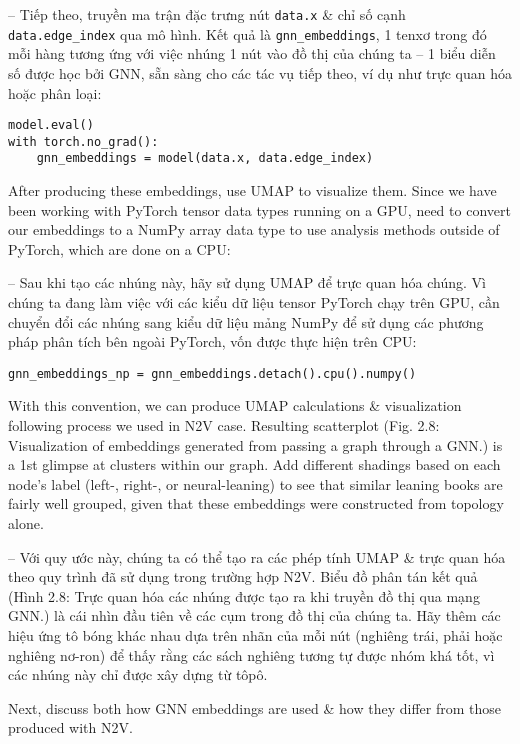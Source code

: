 \documentclass{article}
\begin{document}
\begin{itemize}
\begin{itemize}
\begin{itemize}
\begin{itemize}
               -- Tiếp theo, truyền ma trận đặc trưng nút {\tt data.x} \& chỉ số cạnh \verb|data.edge_index| qua mô hình. Kết quả là \verb|gnn_embeddings|, 1 tenxơ trong đó mỗi hàng tương ứng với việc nhúng 1 nút vào đồ thị của chúng ta -- 1 biểu diễn số được học bởi GNN, sẵn sàng cho các tác vụ tiếp theo, ví dụ như trực quan hóa hoặc phân loại:
               \begin{Verbatim}
model.eval()
with torch.no_grad():
    gnn_embeddings = model(data.x, data.edge_index)
               \end{Verbatim}
               After producing these embeddings, use UMAP to visualize them. Since we have been working with PyTorch tensor data types running on a GPU, need to convert our embeddings to a NumPy array data type to use analysis methods outside of PyTorch, which are done on a CPU:

               -- Sau khi tạo các nhúng này, hãy sử dụng UMAP để trực quan hóa chúng. Vì chúng ta đang làm việc với các kiểu dữ liệu tensor PyTorch chạy trên GPU, cần chuyển đổi các nhúng sang kiểu dữ liệu mảng NumPy để sử dụng các phương pháp phân tích bên ngoài PyTorch, vốn được thực hiện trên CPU:
               \begin{verbatim}
gnn_embeddings_np = gnn_embeddings.detach().cpu().numpy()
               \end{verbatim}
               With this convention, we can produce UMAP calculations \& visualization following process we used in N2V case. Resulting scatterplot ({\sf Fig. 2.8: Visualization of embeddings generated from passing a graph through a GNN.}) is a 1st glimpse at clusters within our graph. Add different shadings based on each node's label (left-, right-, or neural-leaning) to see that similar leaning books are fairly well grouped, given that these embeddings were constructed from topology alone.

               -- Với quy ước này, chúng ta có thể tạo ra các phép tính UMAP \& trực quan hóa theo quy trình đã sử dụng trong trường hợp N2V. Biểu đồ phân tán kết quả ({\sf Hình 2.8: Trực quan hóa các nhúng được tạo ra khi truyền đồ thị qua mạng GNN.}) là cái nhìn đầu tiên về các cụm trong đồ thị của chúng ta. Hãy thêm các hiệu ứng tô bóng khác nhau dựa trên nhãn của mỗi nút (nghiêng trái, phải hoặc nghiêng nơ-ron) để thấy rằng các sách nghiêng tương tự được nhóm khá tốt, vì các nhúng này chỉ được xây dựng từ tôpô.

               Next, discuss both how GNN embeddings are used \& how they differ from those produced with N2V.


\end{itemize}
\end{itemize}
\end{itemize}
\end{itemize}
\end{document}
